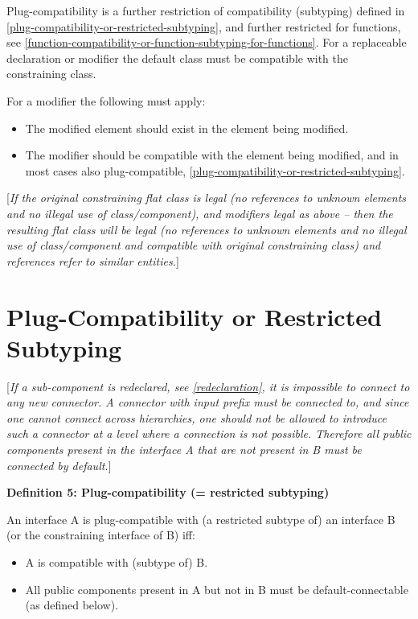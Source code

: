 Plug-compatibility is a further restriction of compatibility (subtyping)
defined in \autoref{plug-compatibility-or-restricted-subtyping}, and further restricted for functions, see
\autoref{function-compatibility-or-function-subtyping-for-functions}. For a replaceable declaration or modifier the default class
must be compatible with the constraining class.

For a modifier the following must apply:

\begin{itemize}
\item
  The modified element should exist in the element being modified.
\item
  The modifier should be compatible with the element being modified, and
  in most cases also plug-compatible, \autoref{plug-compatibility-or-restricted-subtyping}.
\end{itemize}

{[}\emph{If the original constraining flat class is legal (no references
to unknown elements and no illegal use of class/component), and
modifiers legal as above -- then the resulting flat class will be legal
(no references to unknown elements and no illegal use of class/component
and compatible with original constraining class) and references refer to
similar entities.}{]}

\section{Plug-Compatibility or Restricted Subtyping}

{[}\emph{If a sub-component is redeclared, see \autoref{redeclaration}, it is
impossible to connect to any new connector. A connector with input
prefix must be connected to, and since one cannot connect across
hierarchies, one should not be allowed to introduce such a connector at
a level where a connection is not possible. Therefore all public
components present in the interface A that are not present in B must be
connected by default.}{]}

\textbf{Definition 5: Plug-compatibility (= restricted subtyping)}

An interface A is plug-compatible with (a restricted subtype of) an
interface B (or the constraining interface of B) iff:

\begin{itemize}
\item
  A is compatible with (subtype of) B.
\item
  All public components present in A but not in B must be
  default-connectable (as defined below).
\end{itemize}

